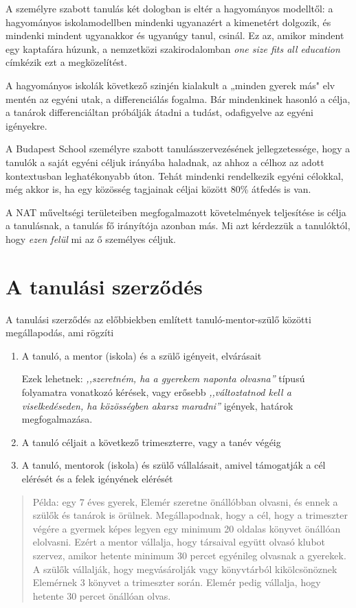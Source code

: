 A személyre szabott tanulás két dologban is eltér a hagyományos modelltől: a hagyományos iskolamodellben mindenki ugyanazért a kimenetért dolgozik, és mindenki mindent ugyanakkor és ugyanúgy tanul, csinál. Ez az, amikor mindent egy kaptafára húzunk, a nemzetközi szakirodalomban \emph{one size fits all education} címkézik ezt a megközelítést.

A hagyományos iskolák következő szinjén kialakult a „minden gyerek más" elv mentén az egyéni utak, a differenciálás fogalma. Bár mindenkinek hasonló a célja, a tanárok differenciáltan próbálják átadni a tudást, odafigyelve az egyéni igényekre.

A Budapest School személyre szabott tanulásszervezésének jellegzetessége, hogy a tanulók a saját egyéni céljuk irányába haladnak, az ahhoz a célhoz az adott kontextusban leghatékonyabb úton. Tehát mindenki rendelkezik egyéni célokkal, még akkor is, ha egy közösség tagjainak céljai között 80\% átfedés is van.

A NAT műveltségi területeiben megfogalmazott követelmények teljesítése is célja a tanulásnak, a tanulás fő irányítója azonban más. Mi azt kérdezzük a tanulóktól, hogy \emph{ezen felül} mi az ő személyes céljuk.

\section{A tanulási szerződés}


A tanulási szerződés az előbbiekben említett tanuló-mentor-szülő közötti megállapodás, ami rögzíti
\begin{enumerate}
\item A tanuló, a mentor (iskola) és a szülő igényeit, elvárásait

    Ezek lehetnek: \emph{,,szeretném, ha a gyerekem naponta olvasna''} típusú folyamatra vonatkozó kérések, vagy erősebb \emph{,,változtatnod kell a viselkedéseden, ha közösségben akarsz maradni''} igények, határok megfogalmazása.

\item A tanuló céljait a következő trimeszterre, vagy a tanév végéig

\item A tanuló, mentorok (iskola) és szülő vállalásait, amivel támogatják a cél elérését és a felek igényének elérését

\end{enumerate}

\begin{quote}
Példa: egy 7 éves gyerek, Elemér szeretne önállóbban olvasni, és ennek a szülők és tanárok is örülnek. Megállapodnak, hogy a cél, hogy a trimeszter végére a gyermek képes legyen egy minimum 20 oldalas könyvet önállóan elolvasni. Ezért a mentor vállalja, hogy társaival együtt olvasó klubot szervez, amikor hetente minimum 30 percet egyénileg olvasnak a gyerekek.
A szülők vállalják, hogy megvásárolják vagy könyvtárból kikölcsönöznek Elemérnek 3 könyvet a trimeszter során. Elemér pedig vállalja, hogy hetente 30 percet önállóan olvas.
\end{quote}

